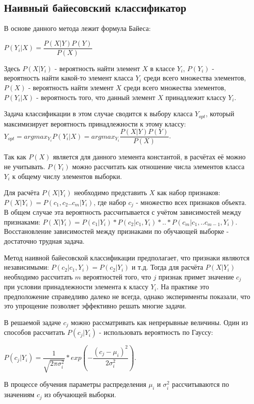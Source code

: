 \subsection{Наивный байесовский классификатор}

В основе данного метода лежит формула Байеса:

$P(Y_i|X)=\dfrac{P(X|Y)P(Y)}{P(X)}$

Здесь $P(X|Y_i)$ - вероятность найти элемент $X$ в классе $Y_i$, $P(Y_i)$ - вероятность найти какой-то элемент класса $Y_i$ среди всего множества элементов, $P(X)$ - вероятность найти элемент $X$ среди всего множества элементов, $P(Y_i|X)$ - вероятность того, что данный элемент $X$ принадлежит классу $Y_i$.

Задача классификации в этом случае сводится к выбору класса $Y_{opt}$, который максимизирует вероятность принадлежности к этому классу: $Y_{opt}=argmax_{Y_i} P(Y_i|X)=argmax_{Y_i} \dfrac{P(X|Y)P(Y)}{P(X)}$.

Так как $P(X)$ является для данного элемента константой, в расчётах её можно не учитывать. $P(Y_i)$ можно рассчитать как отношение числа элементов класса $Y_i$ к общему числу элементов выборки. 

Для расчёта $P(X|Y_i)$ необходимо представить $X$ как набор признаков: $P(X|Y_i)=P(c_1, c_2 .. c_m | Y_i)$, где набор $c_j$ - множество всех признаков объекта. В общем случае эта вероятность рассчитывается с учётом зависимостей между признаками: $P(X|Y_i)=P(c_1|Y_i)*P(c_2|c_1,Y_i)*..*P(c_m|c_1,..c_{m-1},Y_i)$. Восстановление зависимостей между признаками по обучающей выборке - достаточно трудная задача.

Метод наивной байесовской классификации предполагает, что признаки являются независимыми: $P(c_2|c_1,Y_i)=P(c_2|Y_i)$ и т.д. Тогда для расчёта $P(X|Y_i)$ необходимо рассчитать $m$ вероятностей того, что $j$ признак примет значение $c_j$ при условии принадлежности элемента к классу $Y_i$. На практике это предположение справедливо далеко не всегда, однако эксперименты показали, что это упрощение позволяет эффективно решать многие задачи.

В решаемой задаче $c_j$ можно рассматривать как непрерывные величины. Один из способов рассчитать $P(c_j|Y_i)$ - использовать вероятность по Гауссу:

$P(c_j|Y_i)=\dfrac{1}{\sqrt{2\pi\sigma_i^2}}*exp(-\dfrac{(c_j-\mu_i)^2}{2\sigma_i^2})$.

В процессе обучения параметры распределения $\mu_i$ и $\sigma_i^2$ рассчитываются по значениям $c_j$ из обучающей выборки. 


